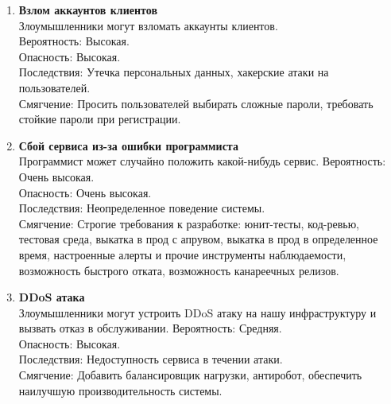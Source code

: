 \begin{enumerate}
      \item \textbf{Взлом аккаунтов клиентов} \\
            Злоумышленники могут взломать аккаунты клиентов. \\
            Вероятность: Высокая. \\
            Опасность: Высокая. \\
            Последствия: Утечка персональных данных, хакерские атаки на пользователей. \\
            Смягчение: Просить пользователей выбирать сложные пароли, требовать 
            стойкие пароли при регистрации.

      \item \textbf{Сбой сервиса из-за ошибки программиста} \\
            Программист может случайно положить какой-нибудь сервис.
            Вероятность: Очень высокая. \\
            Опасность: Очень высокая. \\
            Последствия: Неопределенное поведение системы. \\
            Смягчение: Строгие требования к разработке: 
            юнит-тесты, код-ревью, тестовая среда, выкатка в прод с апрувом,
            выкатка в прод в определенное время, настроенные алерты и прочие 
            инструменты наблюдаемости, возможность быстрого отката,
            возможность канареечных релизов.

      \item \textbf{DDoS атака} \\
            Злоумышленники могут устроить DDoS атаку на нашу инфраструктуру и 
            вызвать отказ в обслуживании.
            Вероятность: Средняя. \\
            Опасность: Высокая. \\
            Последствия: Недоступность сервиса в течении атаки. \\
            Смягчение: Добавить балансировщик нагрузки, антиробот, 
            обеспечить наилучшую производительность системы.

\end{enumerate}